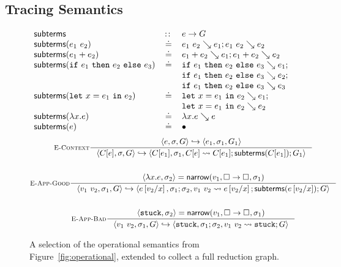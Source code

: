 \subsection{Tracing Semantics}
\label{sec:inter-semant}
%
\begin{figure}[t]
\begin{gather*}
\begin{array}{lcl}
\mathsf{subterms}                 & \colon\!\!\colon & e \to G \\
\mathsf{subterms}(e_1 \ e_2)   & \doteq & e_1 \ e_2 \searrow e_1; e_1 \ e_2 \searrow e_2 \\
\mathsf{subterms}(e_1 + e_2)   & \doteq & e_1 + e_2 \searrow e_1; e_1 + e_2 \searrow e_2 \\
\mathsf{subterms}(\mathtt{if}\ e_1\ \mathtt{then}\ e_2\ \mathtt{else}\ e_3)   & \doteq & \mathtt{if}\ e_1\ \mathtt{then}\ e_2\ \mathtt{else}\ e_3 \searrow e_1; \\
                                &        & \mathtt{if}\ e_1\ \mathtt{then}\ e_2\ \mathtt{else}\ e_3 \searrow e_2; \\
                                &        & \mathtt{if}\ e_1\ \mathtt{then}\ e_2\ \mathtt{else}\ e_3 \searrow e_3 \\
\mathsf{subterms}(\mathtt{let}\ x = e_1\ \mathtt{in}\ e_2)   & \doteq & \mathtt{let}\ x = e_1\ \mathtt{in}\ e_2 \searrow e_1; \\
                                &        & \mathtt{let}\ x = e_1\ \mathtt{in}\ e_2 \searrow e_2 \\
\mathsf{subterms}(\lambda x. e)       & \doteq & \lambda x. e \searrow e \\
\mathsf{subterms}(e)                 & \doteq & \bullet
\end{array}
\end{gather*}
\begin{gather*}
\inference[\recontext]
  {\stepg{e}{\su}{\tr}{e_1}{\su_1}{\tr_1}}
  {\stepg{C[e]}{\su}{\tr}{C[e_1]}{\su_1}{\singlestep{C[e]}{C[e_1]}; \subterms{C[e_1]}; \tr_1}}
\\ \\
\inference[\reappgood]
  {\pair{\efun{x}{e}}{\su_2} = \force{v_1}{\tfun{\thole{}}{\thole{}}}{\su_1}}
  {\stepg{\eapp{v_1}{v_2}}{\su_1}{\tr}
         {e\sub{x}{v_2}}{\su_1;\su_2}{\singlestep{\eapp{v_1}{v_2}}{e\sub{x}{v_2}}; \subterms{e\sub{x}{v_2}}; \tr}}
\\ \\
\inference[\reappbad]
  {\pair{\stuck}{\su_2} = \force{v_1}{\tfun{\thole{}}{\thole{}}}{\su_1}}
  {\stepg{\eapp{v_1}{v_2}}{\su_1}{\tr}{\stuck}{\su_1;\su_2}{\singlestep{\eapp{v_1}{v_2}}{\stuck}; \tr}}
\end{gather*}
\caption{A selection of the operational semantics from
  Figure~\ref{fig:operational}, extended to collect a full reduction
  graph.}
\label{fig:interactive}
\end{figure}

